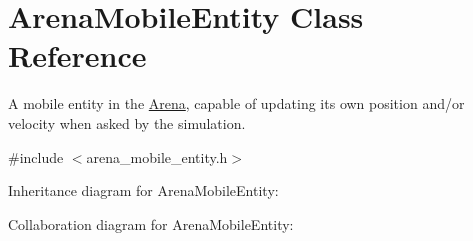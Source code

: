 \hypertarget{classArenaMobileEntity}{}\section{Arena\+Mobile\+Entity Class Reference}
\label{classArenaMobileEntity}


A mobile entity in the \hyperlink{classArena}{Arena}, capable of updating its own position and/or velocity when asked by the simulation.  




{\ttfamily \#include $<$arena\+\_\+mobile\+\_\+entity.\+h$>$}



Inheritance diagram for Arena\+Mobile\+Entity\+:


Collaboration diagram for Arena\+Mobile\+Entity\+:

